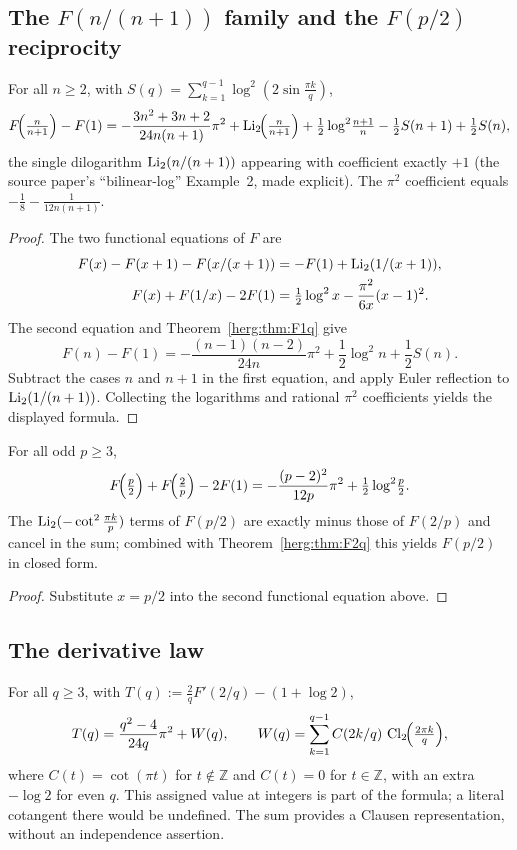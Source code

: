 \subsection{The $F(n/(n+1))$ family and the $F(p/2)$ reciprocity}
\begin{theorem}\label{herg:thm:np1}
For all $n\ge2$, with $S(q)=\sum_{k=1}^{q-1}\log^2(2\sin\tfrac{\pi k}q)$,
\[
  F\!\Bigl(\tfrac{n}{n+1}\Bigr)-F(1)=-\frac{3n^2+3n+2}{24n(n+1)}\pi^2+\operatorname{Li}_2\!\Bigl(\tfrac{n}{n+1}\Bigr)
  +\tfrac12\log^2\!\tfrac{n+1}{n}-\tfrac12 S(n+1)+\tfrac12 S(n),
\]
the single dilogarithm $\operatorname{Li}_2(n/(n+1))$ appearing with coefficient exactly $+1$ (the source paper's
``bilinear-log'' Example~2, made explicit). The $\pi^2$ coefficient equals $-\tfrac18-\tfrac1{12n(n+1)}$.
\end{theorem}
\begin{proof}
The two functional equations of $F$ are
\begin{align*}
F(x)-F(x+1)-F(x/(x+1))&=-F(1)+\operatorname{Li}_2(1/(x+1)),\\
F(x)+F(1/x)-2F(1)&=\tfrac12\log^2x-\frac{\pi^2}{6x}(x-1)^2.
\end{align*}
The second equation and Theorem~\ref{herg:thm:F1q} give
\[
F(n)-F(1)=-\frac{(n-1)(n-2)}{24n}\pi^2
+\frac12\log^2 n+\frac12 S(n).
\]
Subtract the cases $n$ and $n+1$ in the first equation, and apply Euler
reflection to $\operatorname{Li}_2(1/(n+1))$. Collecting the logarithms and rational
$\pi^2$ coefficients yields the displayed formula.
\end{proof}
\begin{theorem}[Reciprocity]\label{herg:thm:p2}
For all odd $p\ge3$,
\[
  F\!\Bigl(\tfrac p2\Bigr)+F\!\Bigl(\tfrac2p\Bigr)-2F(1)=-\frac{(p-2)^2}{12p}\pi^2+\tfrac12\log^2\!\tfrac p2 .
\]
The $\operatorname{Li}_2(-\cot^2\frac{\pi k}{p})$ terms of $F(p/2)$ are exactly minus those of $F(2/p)$ and cancel in the
sum; combined with Theorem~\ref{herg:thm:F2q} this yields $F(p/2)$ in closed form.
\end{theorem}
\begin{proof}
Substitute $x=p/2$ into the second functional equation above.
\end{proof}

\subsection{The derivative law}
\begin{theorem}[Radchenko--Zagier Proposition 4, $P=2$]\label{herg:thm:deriv}
For all $q\ge3$, with $T(q):=\tfrac2q F'(2/q)-(1+\log2)$,
\[
  T(q)=\frac{q^2-4}{24q}\pi^2+W(q),\qquad
  W(q)=\sum_{k=1}^{q-1}C(2k/q)\,\operatorname{Cl}_2\!\Bigl(\tfrac{2\pi k}q\Bigr),
\]
where $C(t)=\cot(\pi t)$ for $t\notin\mathbb Z$ and $C(t)=0$ for
$t\in\mathbb Z$, with an extra $-\log2$ for even $q$.
This assigned value at integers is part of the formula; a literal cotangent
there would be undefined. The sum provides a Clausen representation,
without an independence assertion.
\end{theorem}

